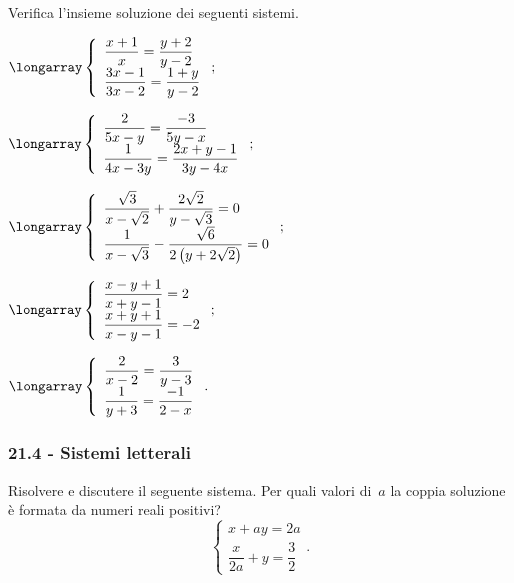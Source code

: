 \begin{esercizio}
 \label{ese:21.51}
Verifica l'insieme soluzione dei seguenti sistemi.
\begin{multicols}{2}
\begin{enumeratea}
\item $\longarray\left\{\begin{array}{l}{\dfrac{x+1}{x}=\dfrac{y+2}{y-2}}\\{\dfrac{3x-1}{3x-2}=\dfrac{1+y}{y-2}}\end{array}\right.;$
\item $\longarray\left\{\begin{array}{l}{\dfrac{2}{5x-y}=\dfrac{-3}{5y-x}}\\{\dfrac{1}{4x-3y}=\dfrac{2x+y-1}{3y-4x}}\end{array}\right.;$
\item $\longarray\left\{\begin{array}{l}{\dfrac{\sqrt{3}}{x-\sqrt{2}}+\dfrac{2\sqrt{2}}{y-\sqrt{3}}=0}\\{\dfrac{1}{x-\sqrt{3}}-\dfrac{\sqrt{6}}{2\left(y+2\sqrt{2}\right)}=0}\end{array}\right.;$
\item $\longarray\left\{\begin{array}{l}{\dfrac{x-y+1}{x+y-1}=2}\\{\dfrac{x+y+1}{x-y-1}=-2}\end{array}\right.;$
\item $\longarray\left\{\begin{array}{l}{\dfrac{2}{x-2}=\dfrac{3}{y-3}}\\{\dfrac{1}{y+3}=\dfrac{-1}{2-x}}\end{array}\right..$
\end{enumeratea}
\end{multicols}
\end{esercizio}
\pagebreak
\subsubsection*{21.4 - Sistemi letterali}

\begin{esercizio}[\Ast]
 \label{ese:21.52}
Risolvere e discutere il seguente sistema. Per quali valori di~$a$ la coppia soluzione è formata da
numeri reali positivi?
\[\left\{\begin{array}{l}{x+ay=2a}\\\dfrac{x}{2a}+y=\dfrac{3}{2}\end{array}\right..\]
\end{esercizio}


